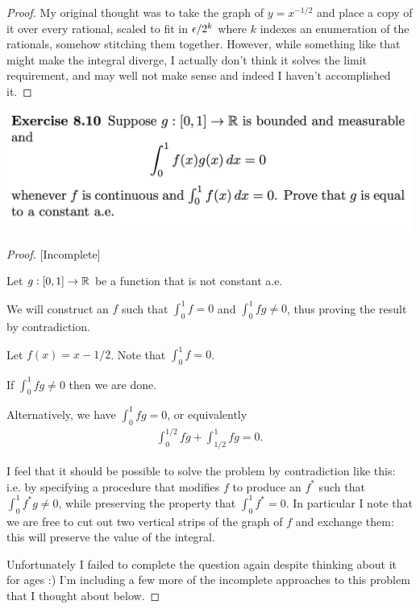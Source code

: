 \begin{proof}
  My original thought was to take the graph of $y = x^{-1/2}$ and place a copy of it over every rational,
  scaled to fit in $\epsilon/2^k$ where $k$ indexes an enumeration of the rationals, somehow stitching them
  together. However, while something like that might make the integral diverge, I actually don't think it
  solves the limit requirement, and may well not make sense and indeed I haven't accomplished it.
\end{proof}
\newpage

\begin{mdframed}
\includegraphics[width=400pt]{img/analysis--berkeley-202a-hw09-113a.png}
\end{mdframed}

\begin{proof}

  [Incomplete]

  Let $g: [0, 1] \to \mathbb{R}$ be a function that is not constant a.e.

  We will construct an $f$ such that $\int_0^1 f = 0$ and $\int_0^1 fg \neq 0$, thus proving the result by
  contradiction.

  Let $f(x) = x - 1/2$. Note that $\int_0^1 f = 0$.

  If $\int_0^1 fg \neq 0$ then we are done.

  Alternatively, we have $\int_0^1 fg = 0$, or equivalently
  \begin{align*}
    \int_0^{1/2} fg + \int_{1/2}^1 fg = 0.
  \end{align*}

  I feel that it should be possible to solve the problem by contradiction like this: i.e. by specifying a
  procedure that modifies $f$ to produce an $f^*$ such that $\int_0^1 f^*g \neq 0$, while preserving the property that $\int_0^1 f^* = 0$. In particular I note that we
  are free to cut out two vertical strips of the graph of $f$ and exchange them: this will preserve the value
  of the integral.

  Unfortunately I failed to complete the question again despite thinking about it for ages :) I'm including a
  few more of the incomplete approaches to this problem that I thought about below.
\end{proof}


